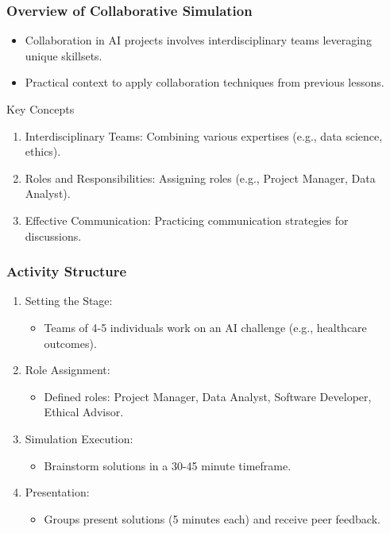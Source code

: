 \documentclass[aspectratio=169]{beamer}
\begin{document}
\begin{frame}[fragile]
    \frametitle{Overview of Collaborative Simulation}
    \begin{itemize}
        \item Collaboration in AI projects involves interdisciplinary teams leveraging unique skillsets.
        \item Practical context to apply collaboration techniques from previous lessons.
    \end{itemize}

    \begin{block}{Key Concepts}
        \begin{enumerate}
            \item Interdisciplinary Teams: Combining various expertises (e.g., data science, ethics).
            \item Roles and Responsibilities: Assigning roles (e.g., Project Manager, Data Analyst).
            \item Effective Communication: Practicing communication strategies for discussions.
        \end{enumerate}
    \end{block}
\end{frame}

\begin{frame}[fragile]
    \frametitle{Activity Structure}
    \begin{enumerate}
        \item Setting the Stage:
            \begin{itemize}
                \item Teams of 4-5 individuals work on an AI challenge (e.g., healthcare outcomes).
            \end{itemize}
        \item Role Assignment:
            \begin{itemize}
                \item Defined roles: Project Manager, Data Analyst, Software Developer, Ethical Advisor.
            \end{itemize}
        \item Simulation Execution:
            \begin{itemize}
                \item Brainstorm solutions in a 30-45 minute timeframe.
            \end{itemize}
        \item Presentation:
            \begin{itemize}
                \item Groups present solutions (5 minutes each) and receive peer feedback.
            \end{itemize}
    \end{enumerate}
\end{frame}
\end{document}
